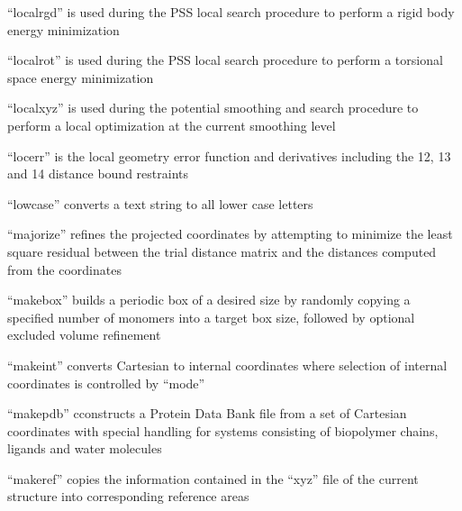 \documentclass[letterpaper,11pt,english]{sphinxmanual}
\begin{document}

“localrgd” is used during the PSS local search procedure
to perform a rigid body energy minimization


“localrot” is used during the PSS local search procedure
to perform a torsional space energy minimization


“localxyz” is used during the potential smoothing and search
procedure to perform a local optimization at the current
smoothing level


“locerr” is the local geometry error function and derivatives
including the 1\sphinxhyphen{}2, 1\sphinxhyphen{}3 and 1\sphinxhyphen{}4 distance bound restraints


“lowcase” converts a text string to all lower case letters


“majorize” refines the projected coordinates by attempting to
minimize the least square residual between the trial distance
matrix and the distances computed from the coordinates



“makebox” builds a periodic box of a desired size by randomly
copying a specified number of monomers into a target box size,
followed by optional excluded volume refinement


“makeint” converts Cartesian to internal coordinates where
selection of internal coordinates is controlled by “mode”


“makepdb” cconstructs a Protein Data Bank file from a set
of Cartesian coordinates with special handling for systems
consisting of biopolymer chains, ligands and water molecules


“makeref” copies the information contained in the “xyz” file
of the current structure into corresponding reference areas
\end{document}
